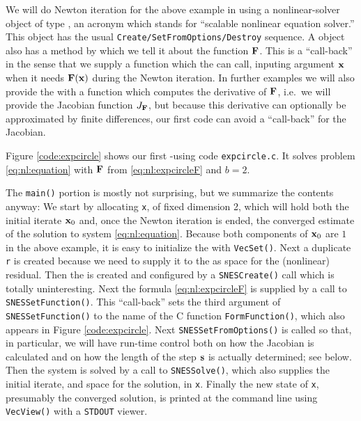 We will do Newton iteration for the above example in \PETSc using a nonlinear-solver object of type \pSNES, an acronym which stands for ``scalable nonlinear equation solver.''  This object has the usual \texttt{Create/SetFromOptions/Destroy} sequence.  A \pSNES object also has a method by which we tell it about the function $\mathbf{F}$.  This is a ``call-back'' in the sense that we supply a function which the \pSNES can call, inputing argument $\mathbf{x}$ when it needs $\mathbf{F}(\mathbf{x})$ during the Newton iteration.  In further examples we will also provide the \pSNES with a function which computes the derivative of $\mathbf{F}$, i.e.~we will provide the Jacobian function $J_{\mathbf{F}}$, but because this derivative can optionally be approximated by finite differences, our first code can avoid a ``call-back'' for the Jacobian.

Figure \ref{code:expcircle} shows our first \pSNES-using code \texttt{expcircle.c}.  It solves problem \eqref{eq:nl:equation} with $\mathbf{F}$ from \eqref{eq:nl:expcircleF} and $b=2$.

\vfill
{}

The \texttt{main()} portion is mostly not surprising, but we summarize the contents anyway:  We start by allocating \pVec \texttt{x}, of fixed dimension 2, which will hold both the initial iterate $\mathbf{x}_0$ and, once the Newton iteration is ended, the converged estimate of the solution to system \eqref{eq:nl:equation}.  Because both components of $\mathbf{x}_0$ are $1$ in the above example, it is easy to initialize the \pVec with \texttt{VecSet()}.  Next a duplicate \pVec \texttt{r} is created because we need to supply it to the \pSNES as space for the (nonlinear) residual.  Then the \pSNES is created and configured by a \texttt{SNESCreate()} call which is totally uninteresting.  Next the formula \eqref{eq:nl:expcircleF} is supplied by a call to \texttt{SNESSetFunction()}.  This ``call-back'' sets the third argument of \texttt{SNESSetFunction()} to the name of the C function \texttt{FormFunction()}, which also appears in Figure \ref{code:expcircle}.  Next \texttt{SNESSetFromOptions()} is called so that, in particular, we will have run-time control both on how the Jacobian is calculated and on how the length of the step $\mathbf{s}$ is actually determined; see below.  Then the system is solved by a call to \texttt{SNESSolve()}, which also supplies the initial iterate, and space for the solution, in \texttt{x}.  Finally the new state of \texttt{x}, presumably the converged solution, is printed at the command line using \texttt{VecView()} with a \texttt{STDOUT} viewer.

